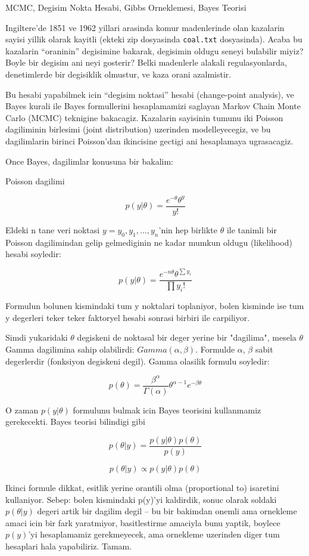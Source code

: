 \documentclass[12pt,fleqn]{article}\usepackage{../common}
\begin{document}
MCMC, Degisim Nokta Hesabi, Gibbs Orneklemesi, Bayes Teorisi

Ingiltere'de 1851 ve 1962 yillari arasinda komur madenlerinde olan
kazalarin sayisi yillik olarak kayitli (ekteki zip dosyasinda
\verb!coal.txt! dosyasinda). Acaba bu kazalarin ``oraninin'' degisimine
bakarak, degisimin oldugu seneyi bulabilir miyiz? Boyle bir degisim ani
neyi gosterir? Belki madenlerle alakali regulasyonlarda, denetimlerde bir
degisiklik olmustur, ve kaza orani azalmistir.

Bu hesabi yapabilmek icin ``degisim noktasi'' hesabi (change-point
analysis), ve Bayes kurali ile Bayes formullerini hesaplamamizi
saglayan Markov Chain Monte Carlo (MCMC) teknigine
bakacagiz. Kazalarin sayisinin tumunu iki Poisson dagiliminin
birlesimi (joint distribution) uzerinden modelleyecegiz, ve bu
dagilimlarin birinci Poisson'dan ikincisine gectigi ani hesaplamaya
ugrasacagiz.

Once Bayes, dagilimlar konusuna bir bakalim:

Poisson dagilimi

\[ p(y|\theta) = \frac{e^{-\theta}\theta^y}{y!} \]

Eldeki n tane veri noktasi $y=y_0, y_1,...,y_n$'nin hep birlikte
$\theta$ ile tanimli bir Poisson dagilimindan gelip gelmediginin ne
kadar mumkun oldugu (likelihood) hesabi soyledir:

\[ p(y|\theta) = \frac{e^{-n\theta}\theta^{\sum y_i}}{\prod y_i!}  \]

Formulun bolunen kismindaki tum y noktalari toplaniyor, bolen kisminde
ise tum y degerleri teker teker faktoryel hesabi sonrasi birbiri ile
carpiliyor.

Simdi yukaridaki $\theta$ degiskeni de noktasal bir deger yerine bir
"dagilima", mesela $\theta$ Gamma dagilimina sahip olabilirdi:
$Gamma(\alpha, \beta)$. Formulde $\alpha$, $\beta$ sabit degerlerdir
(fonksiyon degiskeni degil). Gamma olasilik formulu soyledir:

\[ p(\theta) = \frac{\beta^\alpha}{\Gamma(\alpha)}\theta^{\alpha-1}e^{-\beta\theta} \]

O zaman $p(y|\theta)$ formulunu bulmak icin Bayes teorisini
kullanmamiz gerekecekti. Bayes teorisi bilindigi gibi

\[ p(\theta|y) = \frac{p(y|\theta)p(\theta)}{p(y)} \]

\[ p(\theta|y) \propto p(y|\theta)p(\theta) \]

Ikinci formule dikkat, esitlik yerine orantili olma (proportional to)
isaretini kullaniyor. Sebep: bolen kismindaki p(y)'yi kaldirdik, sonuc
olarak soldaki $p(\theta|y)$ degeri artik bir dagilim degil -- bu bir
bakimdan onemli ama ornekleme amaci icin bir fark yaratmiyor,
basitlestirme amaciyla bunu yaptik, boylece $p(y)$'yi hesaplamamiz
gerekmeyecek, ama ornekleme uzerinden diger tum hesaplari hala
yapabiliriz. Tamam.
\end{document}
